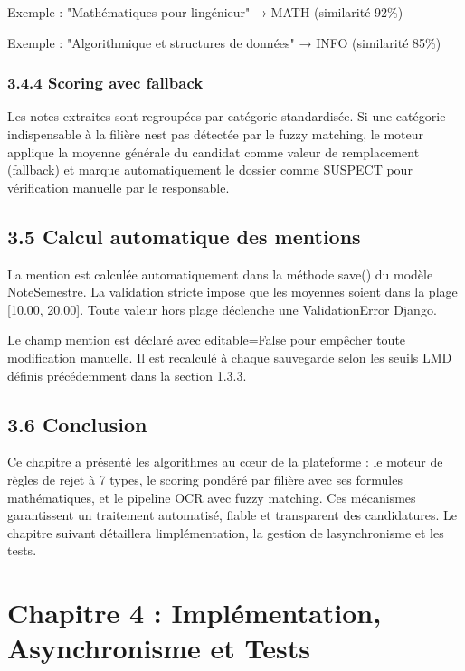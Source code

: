 \documentclass[
]{article}
\begin{document}
Exemple : "Mathématiques pour l\textquotesingle ingénieur" → MATH
(similarité 92\%)

Exemple : "Algorithmique et structures de données" → INFO (similarité
85\%)

\hypertarget{scoring-avec-fallback}{%
\subsubsection{3.4.4 Scoring avec
fallback}\label{scoring-avec-fallback}}

Les notes extraites sont regroupées par catégorie standardisée. Si une
catégorie indispensable à la filière n\textquotesingle est pas détectée
par le fuzzy matching, le moteur applique la moyenne générale du
candidat comme valeur de remplacement (fallback) et marque
automatiquement le dossier comme SUSPECT pour vérification manuelle par
le responsable.

\hypertarget{calcul-automatique-des-mentions}{%
\subsection{3.5 Calcul automatique des
mentions}\label{calcul-automatique-des-mentions}}

La mention est calculée automatiquement dans la méthode save() du modèle
NoteSemestre. La validation stricte impose que les moyennes soient dans
la plage {[}10.00, 20.00{]}. Toute valeur hors plage déclenche une
ValidationError Django.

Le champ mention est déclaré avec editable=False pour empêcher toute
modification manuelle. Il est recalculé à chaque sauvegarde selon les
seuils LMD définis précédemment dans la section 1.3.3.

\hypertarget{conclusion-2}{%
\subsection{3.6 Conclusion}\label{conclusion-2}}

Ce chapitre a présenté les algorithmes au cœur de la plateforme : le
moteur de règles de rejet à 7 types, le scoring pondéré par filière avec
ses formules mathématiques, et le pipeline OCR avec fuzzy matching. Ces
mécanismes garantissent un traitement automatisé, fiable et transparent
des candidatures. Le chapitre suivant détaillera
l\textquotesingle implémentation, la gestion de
l\textquotesingle asynchronisme et les tests.

\hypertarget{chapitre-4-impluxe9mentation-asynchronisme-et-tests}{%
\section{Chapitre 4 : Implémentation, Asynchronisme et
Tests}\label{chapitre-4-impluxe9mentation-asynchronisme-et-tests}}
\end{document}
